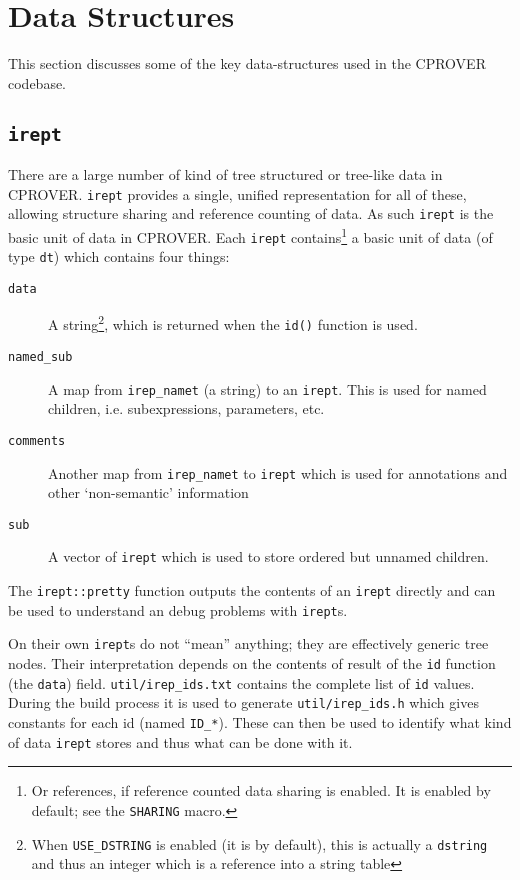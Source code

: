 \documentclass{article}
\newcommand{\file}[1]{\texttt{#1}}
\newcommand{\code}[1]{\texttt{#1}}
\begin{document}
\section{Data Structures}

This section discusses some of the key data-structures used in the
CPROVER codebase.

\subsection{\code{irept}}
\label{section:irept}

There are a large number of kind of tree structured or tree-like data
in CPROVER.  \code{irept} provides a single, unified representation for
all of these, allowing structure sharing and reference counting of
data.  As such \code{irept} is the basic unit of data in CPROVER.
Each \code{irept} contains\footnote{Or references, if reference
  counted data sharing is enabled.  It is enabled by default; see the
  \code{SHARING} macro.} a basic unit of data (of type \code{dt})
which contains four things:

\begin{description}
\item[\code{data}]{A string\footnote{When \code{USE\_DSTRING} is enabled (it
    is by default), this is actually a \code{dstring} and thus an
    integer which is a reference into a string table}, which is
    returned when the \code{id()} function is used.}
\item[\code{named\_sub}]{A map from \code{irep\_namet} (a string) to
    an \code{irept}.  This is used for named children,
    i.e. subexpressions, parameters, etc.}
\item[\code{comments}]{Another map from \code{irep\_namet} to
  \code{irept} which is used for annotations and other `non-semantic' information}
\item[\code{sub}]{A vector of \code{irept} which is used to store
  ordered but unnamed children.}
\end{description}

The \code{irept::pretty} function outputs the contents of an
\code{irept} directly and can be used to understand an debug problems
with \code{irept}s.


On their own \code{irept}s do not ``mean'' anything; they are
effectively generic tree nodes.  Their interpretation depends on the
contents of result of the \code{id} function (the \code{data}) field.
\file{util/irep\_ids.txt} contains the complete list of \code{id}
values.  During the build process it is used to generate
\file{util/irep\_ids.h} which gives constants for each id (named
\code{ID\_*}).  These can then be used to identify what kind of data
\code{irept} stores and thus what can be done with it.
\end{document}
